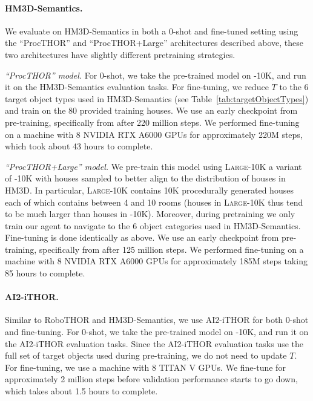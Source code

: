\paragraph{HM3D-Semantics.} We evaluate on HM3D-Semantics in both a 0-shot and fine-tuned setting using the ``ProcTHOR'' and ``ProcTHOR+Large'' architectures described above, these two architectures have slightly different pretraining strategies. 

\noindent \emph{``ProcTHOR'' model.} For 0-shot, we take the pre-trained model on \env{}-10K, and run it on the HM3D-Semantics evaluation tasks. For fine-tuning, we reduce $T$ to the 6 target object types used in HM3D-Semantics (see Table~\ref{tab:targetObjectTypes}) and train on the 80 provided training houses. We use an early checkpoint from \env{} pre-training, specifically from after 220 million steps. We performed fine-tuning on a machine with 8 NVIDIA RTX A6000 GPUs for approximately 220M steps, which took about 43 hours to complete.

\noindent \emph{``ProcTHOR+Large'' model.} We pre-train this model using \env{}\textsc{Large}-10K a variant of \env{}-10K with houses sampled to better align to the distribution of houses in HM3D. In particular, \env{}\textsc{Large}-10K contains 10K procedurally generated houses each of which contains between 4 and 10 rooms (houses in \env{}\textsc{Large}-10K thus tend to be much larger than houses in \env{}-10K). Moreover, during pretraining we only train our agent to navigate to the 6 object categories used in HM3D-Semantics. Fine-tuning is done identically as above. We use an early checkpoint from \env{} pre-training, specifically from after 125 million steps. We performed fine-tuning on a machine with 8 NVIDIA RTX A6000 GPUs for approximately 185M steps taking 85 hours to complete.

\paragraph{AI2-iTHOR.} Similar to RoboTHOR and HM3D-Semantics, we use AI2-iTHOR for both 0-shot and fine-tuning. For 0-shot, we take the pre-trained model on \env{}-10K, and run it on the AI2-iTHOR evaluation tasks. Since the AI2-iTHOR evaluation tasks use the full set of target objects used during \env{} pre-training, we do not need to update $T$. For fine-tuning, we use a machine with 8 TITAN V GPUs. We fine-tune for approximately 2 million steps before validation performance starts to go down, which takes about 1.5 hours to complete.

